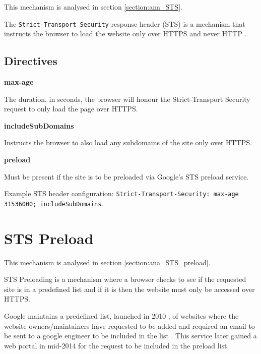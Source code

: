 \documentclass{mscreport}
\begin{document}
This mechanism is analysed in section \ref{section:ana_STS}.

\vspace{0.3cm} \noindent
The \texttt{Strict-Transport Security} response header (STS) is a mechanism that instructs the browser to load the website only over HTTPS and never HTTP \cite{Hodges2012-pe}.

\subsection{Directives}

\textbf{max-age}

\noindent
The duration, in seconds, the browser will honour the Strict-Transport Security request to only load the page over HTTPS.

\vspace{0.7cm} \noindent
\textbf{includeSubDomains}

\vspace{0.3cm} \noindent
Instructs the browser to also load any subdomains of the site only over HTTPS.

\vspace{0.7cm} \noindent
\textbf{preload}

\vspace{0.3cm} \noindent
Must be present if the site is to be preloaded via Google's STS preload service.

\vspace{0.3cm} \noindent
Example STS header configuration: \texttt{Strict-Transport-Security: max-age 31536000; includeSubDomains}.

\section{STS Preload}
\label{section:bg_STS_preload}

This mechanism is analysed in section \ref{section:ana_STS_preload}.

\vspace{0.3cm} \noindent
STS Preloading is a mechanism where a browser checks to see if the requested site is in a predefined list and if it is then the website must only be accessed over HTTPS.

\vspace{0.3cm} \noindent
Google maintains a predefined list, launched in 2010 \cite{Michael2015-hn}, of websites where the website owners/maintainers have requested to be added and required an email to be sent to a google  engineer to be included in the list \cite{Langley_undated-dm}. This service later gained a web portal in mid-2014 \cite{Michael2015-hn} for the request to be included in the preload list.
\end{document}
